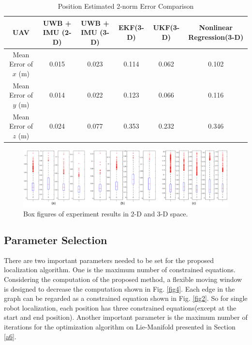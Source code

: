 \documentclass[journal]{IEEEtran}
\begin{document}
\begin{table}[ht!]
  \begin{center}
  \caption{Position Estimated 2-norm Error Comparison}
  \label{errortable3}
        \begin{tabular}{c|c|c|c|c|c}
        \hline\hline
         UAV &UWB + IMU (2-D)  &UWB + IMU (3-D) &  EKF(3-D)  & UKF(3-D) & Nonlinear Regression(3-D)\\
        \hline
         Mean Error of $x$ (m) &0.015 &0.023 & 0.114 &0.062  &  0.102 \\
        Mean Error of $y$ (m)&0.014 &0.022  & 0.123 &0.066  &  0.116 \\
        Mean Error of $z$ (m)&0.024 &0.077 & 0.353 &0.232 &  0.346 \\
        \hline\hline
        \end{tabular}
  \end{center}
\end{table}

\begin{figure}[!t]
	\centering
	\includegraphics[width=0.9\linewidth]{pic/box}
	\caption{Box figures of experiment results in 2-D and 3-D space. }
	\label{fig10}
\end{figure}

\subsection{Parameter Selection}

There are two important parameters needed to be set for the proposed localization algorithm. One is the maximum number of constrained equations. Considering the computation of the proposed method, a flexible moving window is designed to decrease the computation shown in Fig. \ref{fig4}. Each edge in the graph can be regarded as a constrained equation shown in Fig. \ref{fig2}. So for single robot localization, each position has three constrained equations(except at the start and end position). Another important parameter is the maximum number of iterations for the optimization algorithm on Lie-Manifold presented in Section \ref{a6}. 
\end{document}
